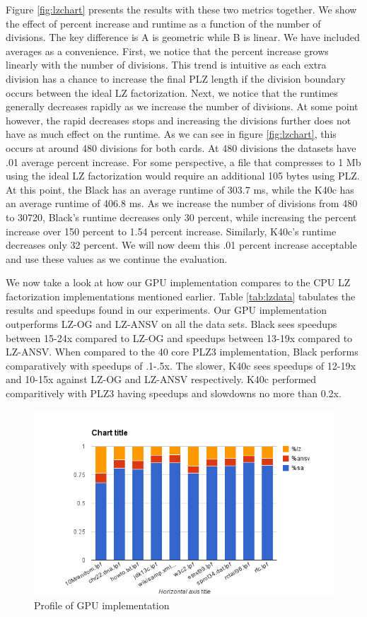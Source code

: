 Figure \ref{fig:lzchart} presents the results with these two metrics together.
We show the effect of percent increase and runtime as a function of the number of divisions.
The key difference is A is geometric while B is linear.
We have included averages as a convenience.
First, we notice that the percent increase grows linearly with the number of divisions.
This trend is intuitive as each extra division has a chance to increase the final PLZ length if the division boundary occurs between the ideal LZ factorization.
Next, we notice that the runtimes generally decreases rapidly as we increase the number of divisions.
At some point however, the rapid decreases stops and increasing the divisions further does not have as much effect on the runtime.
As we can see in figure \ref{fig:lzchart}, this occurs at around 480 divisions for both cards.
At 480 divisions the datasets have .01 average percent increase.
For some perspective, a file that compresses to 1 Mb using the ideal LZ factorization would require an additional 105 bytes using PLZ.
At this point, the Black has an average runtime of 303.7 ms, while the K40c has an average runtime of 406.8 ms.
As we increase the number of divisions from 480 to 30720, Black's runtime decreases only 30 percent, while increasing the percent increase over 150 percent to 1.54 percent increase.
Similarly, K40c's runtime decreases only 32 percent.
We will now deem this .01 percent increase acceptable and use these values as we continue the evaluation.

We now take a look at how our GPU implementation compares to the CPU LZ factorization implementations mentioned earlier.
Table \ref{tab:lzdata} tabulates the results and speedups found in our experiments.
Our GPU implementation outperforms LZ-OG and LZ-ANSV on all the data sets.
Black sees speedups between 15-24x compared to LZ-OG and speedups between 13-19x compared to LZ-ANSV.
When compared to the 40 core PLZ3 implementation, Black performs comparatively with speedups of .1-.5x.
The slower, K40c sees speedups of 12-19x and 10-15x against LZ-OG and LZ-ANSV respectively.
K40c performed comparitively with PLZ3 having speedups and slowdowns no more than 0.2x.

\begin{figure}[ht!]
\centering
\includegraphics[width=1.0\textwidth]{images/allprof.png}
\caption{Profile of GPU implementation}
\label{fig:allprof}
\end{figure}

